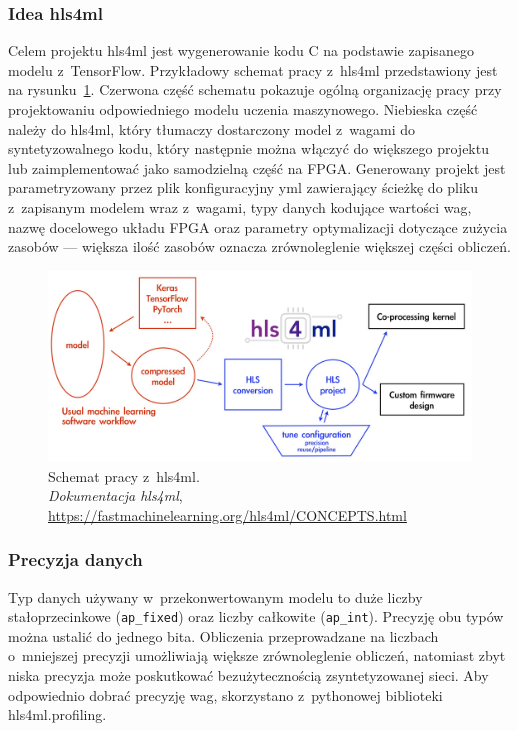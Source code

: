 \documentclass[12pt, oneside, a4paper]{article}
\def\CPP{{C\nolinebreak[4]\hspace{-.05em}\raisebox{.4ex}{\tiny\bf ++}}}
\begin{document}
\subsubsection{Idea hls4ml}\label{sec:Idea hls4ml}
Celem projektu hls4ml jest wygenerowanie kodu \CPP{} na podstawie zapisanego
modelu z~TensorFlow. Przykładowy schemat pracy z~hls4ml przedstawiony jest
na rysunku~\ref{fig:hls4ml}.
Czerwona część schematu pokazuje ogólną organizację pracy przy projektowaniu 
odpowiedniego modelu uczenia maszynowego. Niebieska część należy do hls4ml,
który tłumaczy dostarczony model z~wagami do syntetyzowalnego kodu, który
następnie można włączyć do większego projektu lub zaimplementować jako
samodzielną część na FPGA. Generowany projekt jest parametryzowany
przez plik konfiguracyjny yml zawierający ścieżkę do pliku z~zapisanym modelem
wraz z~wagami, typy danych kodujące wartości wag, nazwę docelowego układu FPGA
oraz parametry optymalizacji dotyczące zużycia zasobów --- większa ilość
zasobów oznacza zrównoleglenie większej części obliczeń.
\begin{figure}[h]
  \centering
  \includegraphics[width=0.95\linewidth]{figures/hls4ml.jpg}
  \caption{Schemat pracy z~hls4ml. \\
  \textit{Dokumentacja hls4ml},
  \url{https://fastmachinelearning.org/hls4ml/CONCEPTS.html}}\label{fig:hls4ml}
\end{figure}

\subsubsection{Precyzja danych}\label{sec:Precyzja danych}
Typ danych używany w~przekonwertowanym modelu to duże liczby
stałoprzecinkowe (\lstinline{ap_fixed}) oraz liczby całkowite
(\lstinline{ap_int}).
Precyzję obu typów można ustalić do jednego bita.
Obliczenia przeprowadzane na liczbach o~mniejszej
precyzji umożliwiają większe zrównoleglenie obliczeń,
natomiast zbyt niska precyzja może poskutkować
bezużytecznością zsyntetyzowanej sieci. Aby odpowiednio dobrać precyzję
wag, skorzystano z~pythonowej biblioteki hls4ml.profiling.
\end{document}
